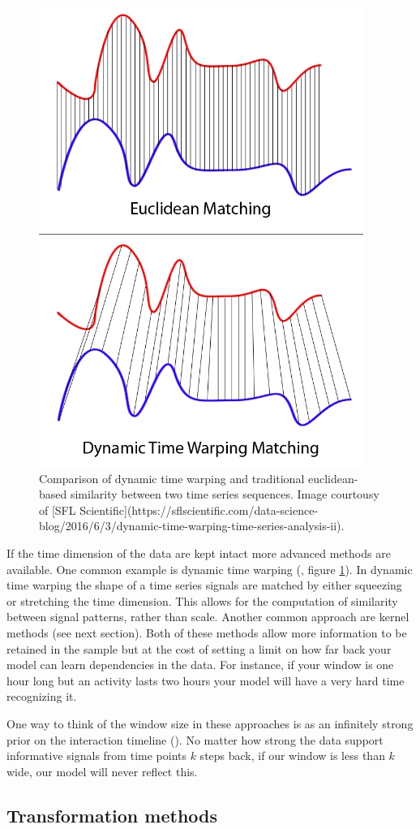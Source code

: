 \documentclass[]{book}
\theoremstyle{definition}
\theoremstyle{definition}
\theoremstyle{definition}
\theoremstyle{remark}
\begin{document}
\begin{figure}

{\centering \includegraphics[width=0.35\linewidth]{figures/dtw} 

}

\caption{Comparison of dynamic time warping and traditional euclidean-based similarity between two time series sequences. Image courtousy of [SFL Scientific](https://sflscientific.com/data-science-blog/2016/6/3/dynamic-time-warping-time-series-analysis-ii).}\label{fig:dynamictimewarp}
\end{figure}

If the time dimension of the data are kept intact more advanced methods
are available. One common example is dynamic time warping (\citet{dtw},
figure \ref{fig:dynamictimewarp}). In dynamic time warping the shape of
a time series signals are matched by either squeezing or stretching the
time dimension. This allows for the computation of similarity between
signal patterns, rather than scale. Another common approach are kernel
methods (see next section). Both of these methods allow more information
to be retained in the sample but at the cost of setting a limit on how
far back your model can learn dependencies in the data. For instance, if
your window is one hour long but an activity lasts two hours your model
will have a very hard time recognizing it.

One way to think of the window size in these approaches is as an
infinitely strong prior on the interaction timeline
(\citet{graves_rnn}). No matter how strong the data support informative
signals from time points \(k\) steps back, if our window is less than
\(k\) wide, our model will never reflect this.

\subsection{Transformation methods}\label{transformation-methods}
\end{document}
